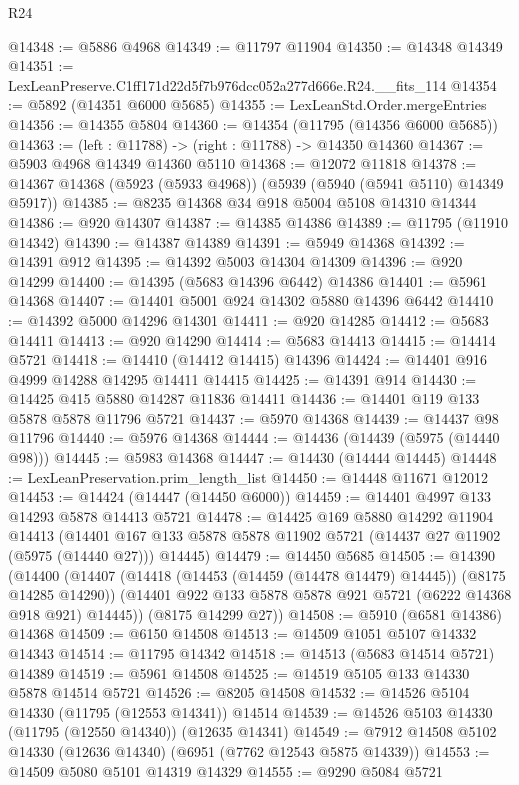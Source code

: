 \begin{lexlean}{R24}
\begin{coremodule}
@14348 := @5886 @4968
@14349 := @11797 @11904
@14350 := @14348 @14349
@14351 := LexLeanPreserve.C1ff171d22d5f7b976dcc052a277d666e.R24.__fits_114
@14354 := @5892 (@14351 @6000 @5685)
@14355 := LexLeanStd.Order.mergeEntries
@14356 := @14355 @5804
@14360 := @14354 (@11795 (@14356 @6000 @5685))
@14363 := (left : @11788) -> (right : @11788) -> @14350 @14360
@14367 := @5903 @4968 @14349 @14360 @5110
@14368 := @12072 @11818
@14378 := @14367 @14368 (@5923 (@5933 @4968)) (@5939 (@5940 (@5941 @5110) @14349 @5917))
@14385 := @8235 @14368 @34 @918 @5004 @5108 @14310 @14344
@14386 := @920 @14307
@14387 := @14385 @14386
@14389 := @11795 (@11910 @14342)
@14390 := @14387 @14389
@14391 := @5949 @14368
@14392 := @14391 @912
@14395 := @14392 @5003 @14304 @14309
@14396 := @920 @14299
@14400 := @14395 (@5683 @14396 @6442) @14386
@14401 := @5961 @14368
@14407 := @14401 @5001 @924 @14302 @5880 @14396 @6442
@14410 := @14392 @5000 @14296 @14301
@14411 := @920 @14285
@14412 := @5683 @14411
@14413 := @920 @14290
@14414 := @5683 @14413
@14415 := @14414 @5721
@14418 := @14410 (@14412 @14415) @14396
@14424 := @14401 @916 @4999 @14288 @14295 @14411 @14415
@14425 := @14391 @914
@14430 := @14425 @415 @5880 @14287 @11836 @14411
@14436 := @14401 @119 @133 @5878 @5878 @11796 @5721
@14437 := @5970 @14368
@14439 := @14437 @98 @11796
@14440 := @5976 @14368
@14444 := @14436 (@14439 (@5975 (@14440 @98)))
@14445 := @5983 @14368
@14447 := @14430 (@14444 @14445)
@14448 := LexLeanPreservation.prim_length_list
@14450 := @14448 @11671 @12012
@14453 := @14424 (@14447 (@14450 @6000))
@14459 := @14401 @4997 @133 @14293 @5878 @14413 @5721
@14478 := @14425
    @169
    @5880
    @14292
    @11904
    @14413
    (@14401 @167 @133 @5878 @5878 @11902 @5721 (@14437 @27 @11902 (@5975 (@14440 @27))) @14445)
@14479 := @14450 @5685
@14505 := @14390
    (@14400
      (@14407
        (@14418 (@14453 (@14459 (@14478 @14479) @14445)) (@8175 @14285 @14290))
        (@14401 @922 @133 @5878 @5878 @921 @5721 (@6222 @14368 @918 @921) @14445))
      (@8175 @14299 @27))
@14508 := @5910 (@6581 @14386) @14368
@14509 := @6150 @14508
@14513 := @14509 @1051 @5107 @14332 @14343
@14514 := @11795 @14342
@14518 := @14513 (@5683 @14514 @5721) @14389
@14519 := @5961 @14508
@14525 := @14519 @5105 @133 @14330 @5878 @14514 @5721
@14526 := @8205 @14508
@14532 := @14526 @5104 @14330 (@11795 (@12553 @14341)) @14514
@14539 := @14526 @5103 @14330 (@11795 (@12550 @14340)) (@12635 @14341)
@14549 := @7912 @14508 @5102 @14330 (@12636 @14340) (@6951 (@7762 @12543 @5875 @14339))
@14553 := @14509 @5080 @5101 @14319 @14329
@14555 := @9290 @5084 @5721

\end{coremodule}
\end{lexlean}

